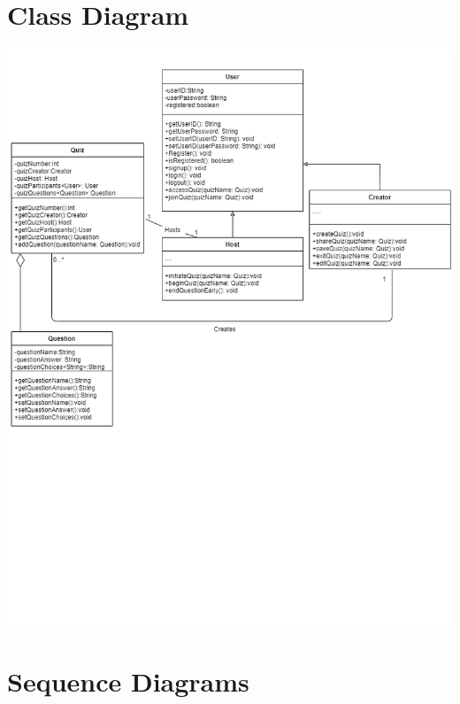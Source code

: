 \documentclass[a4paper]{article}
\begin{document}
	\section{Class Diagram}
	\includegraphics[scale=0.55]{Class_Diagram}
	
	\section{Sequence Diagrams}
\end{document}
